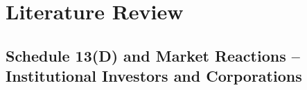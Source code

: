 \documentclass[12pt]{article}
\begin{document}

\section{Literature Review}

\subsection{Schedule 13(D) and Market Reactions -- Institutional Investors and Corporations}
\end{document}
